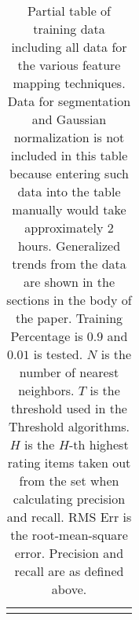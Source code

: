 \documentclass{article}
\begin{document}
\begin{longtable}{ |p{1.7cm}|p{1.9cm}|p{1.5cm}|p{1.5cm}|p{0.75cm}|p{0.75cm}|p{0.75cm}|p{0.75cm}|p{1.5cm}|p{1.5cm}|}
    \hline
    \caption{Partial table of training data including all data for the various feature mapping techniques. Data for 
    segmentation and Gaussian normalization is not included in this table because entering such data into the table
    manually would take approximately 2 hours. Generalized trends from the data are shown in the sections in the body
    of the paper. Training Percentage is $0.9$ and $0.01$ is tested. 
    $N$ is the number of nearest neighbors. $T$ is the threshold
    used in the Threshold algorithms. $H$ is the $H$-th highest rating items taken out from the set when calculating 
    precision and recall. RMS Err is the root-mean-square error. Precision and recall are as defined above.}\label{results-basic}
\end{longtable}


\end{document}
